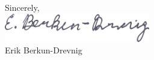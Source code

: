 \bigskip
\noindent
Sincerely,\\
\vspace{-0.1in}
\includegraphics[width=2.5in, trim=0 0 0 -1in]{signature.pdf}\\
Erik Berkun-Drevnig
